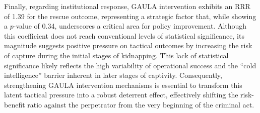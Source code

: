 \documentclass[12pt,a4paper]{article}
\theoremstyle{plain}
\theoremstyle{definition}
\theoremstyle{remark}
\newcommand{\1}{\mathbf{1}}
\begin{document}
Finally, regarding institutional response, GAULA intervention exhibits an RRR of 1.39 for the rescue outcome, representing a strategic factor that, while showing a \(p\)-value of 0.34, underscores a critical area for policy improvement. Although this coefficient does not reach conventional levels of statistical significance, its magnitude suggests positive pressure on tactical outcomes by increasing the risk of capture during the initial stages of kidnapping. This lack of statistical significance likely reflects the high variability of operational success and the ``cold intelligence'' barrier inherent in later stages of captivity. Consequently, strengthening GAULA intervention mechanisms is essential to transform this latent tactical pressure into a robust deterrent effect, effectively shifting the risk-benefit ratio against the perpetrator from the very beginning of the criminal act.
\end{document}
